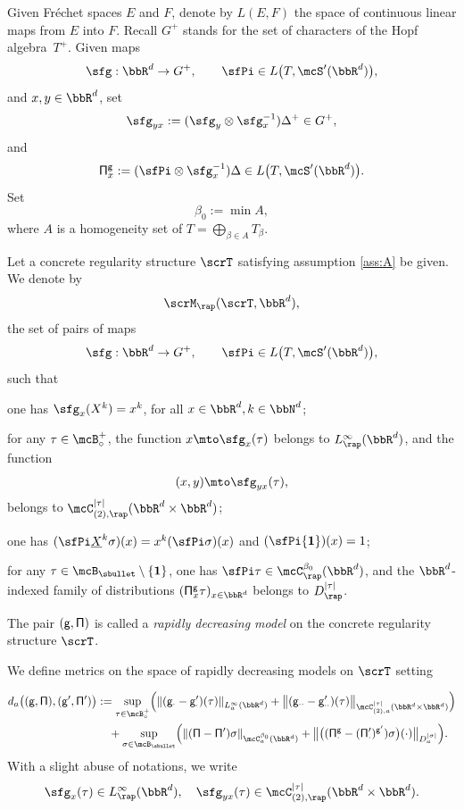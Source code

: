 Given Fréchet spaces $E$ and $F$, denote by $L(E,F)$ the space of continuous linear maps from $E$ into $F$. Recall $G^+$ stands for the set of characters of the Hopf algebra~$T^+$. Given maps
\[
\sfg:\bbR^d\to G^+,\qquad \sfPi\in L\bigl(T,\mcS'(\bbR^d)\bigr),
\]
and $x,y\in\bbR^d$, set
\[
\sfg_{yx} := (\sfg_y\otimes\sfg_x^{-1})\Delta^+\in G^+,
\]
and
\[
{\sf \Pi}^{\sf g}_x:=(\sfPi\otimes\sfg_x^{-1})\Delta\in L\bigl(T,\mcS'(\bbR^d)\bigr).
\]
Set
\[
\beta_0:=\min A,
\]
where $A$ is a homogeneity set of $T=\bigoplus_{\beta\in A}T_\beta$.

\begin{defn} \label{defi:weighted model}
Let a concrete regularity structure $\scrT$ satisfying assumption \eqref{ass:A} be given. We denote by
\[
\scrM_\rap(\scrT,\bbR^d),
\]
the set of pairs of maps
\[
\sfg : \bbR^d\to G^+,\qquad \sfPi\in L\bigl(T,\mcS'(\bbR^d)\bigr),
\]
such that
\begin{enumeratea}
	\item\label{defi:weighted modela} one has $\sfg_x(X^k)=x^k$, for all $x\in\bbR^d, k\in\bbN^d$;

	\item\label{defi:weighted modelb} for any $\tau\in\mcB_\circ^+$, the function $x\mto\sfg_x(\tau)$ belongs to $L_\rap^\infty(\bbR^d)$, and the function
\[
(x,y)\mto\sfg_{yx}(\tau),
\]
belongs to $\mcC_{(2),\rap}^{|\tau|}(\bbR^d\times\bbR^d)$;

	\item\label{defi:weighted modelc} one has $(\sfPi \underline{X}^k\sigma)(x)=x^k(\sfPi\sigma)(x)$ and $(\sfPi{\bf1})(x) = 1$;

	\item\label{defi:weighted modeld} for any $\tau\in\mcB_\sbullet\setminus\{{\bf1}\}$, one has $\sfPi\tau\in \mcC^{\beta_0}_\rap(\bbR^d)$, and the $\bbR^d$-indexed family of distributions $({\sf \Pi}^{\sf g}_x\tau)_{x\in\bbR^d}$ belongs to $D_\rap^{|\tau|}$.
\end{enumeratea}
The pair $\sf (g,\Pi)$ is called a \emph{rapidly decreasing model} on the concrete regularity structure $\scrT$.
\end{defn}

We define metrics on the space of rapidly decreasing models on $\scrT$ setting

\begin{align*}
d_a\bigl(({\sf g},{\sf\Pi}),({\sf g}',{\sf\Pi}')\bigr)
&:= \sup_{\tau\in\mcB_\circ^+}
\Bigl(\|({\sf g}_\cdot-{\sf g}_\cdot')(\tau)\|_{L_a^\infty(\bbR^d)}
+ \big\|({\sf g}_{\cdot\cdot}-{\sf g}_{\cdot\cdot}')(\tau)\big\|_{\mcC^{\vert\tau\vert}_{(2),a}(\bbR^d\times\bbR^d)}\Bigr)\\
&\quad+\sup_{\sigma\in\mcB_\sbullet}
\Bigl(\|({\sf\Pi}-{\sf\Pi}')\sigma\|_{\mcC^{\beta_0}_a(\bbR^d)}
+ \big\|\bigl(({\sf\Pi}_\cdot^{\sf g}-({\sf\Pi}_\cdot')^{{\sf g}'})\sigma\bigr)(\cdot) \big\|_{D^{\vert\sigma\vert}_{a}}\Bigr).
\end{align*}
With a slight abuse of notations, we write
\[
\sfg_x(\tau)\in L_\rap^\infty(\bbR^d),\quad \sfg_{yx}(\tau)\in \mcC_{(2),\rap}^{|\tau|}(\bbR^d\times\bbR^d).
\]

